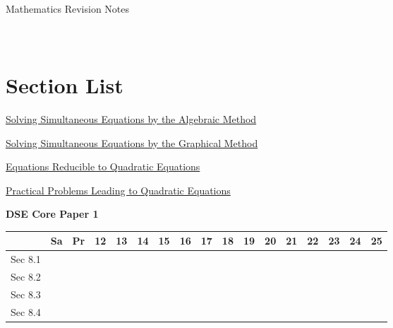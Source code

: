 \documentclass[12pt, a4paper]{article}
\begin{document}
\newpage
\newpage
\thispagestyle{empty}
\begin{center}
Mathematics Revision Notes\\\vspace{1cm}
\\\vspace{1cm}
{\fontsize{24pt}{24pt}\selectfont {More about Equations \NF}} \\\vspace{1cm}
\label{chapter:S4-8}

\end{center}
\vspace{0.5cm}
\hline
\section*{Section List}
\begin{enumx}[label=Sec 8.\arabic*\ ]
\item \hyperref[section:4-8-1]{Solving Simultaneous Equations by the Algebraic Method  \NF}
\item \hyperref[section:4-8-2]{Solving Simultaneous Equations by the Graphical Method \NF}
\item \hyperref[section:4-8-3]{Equations Reducible to Quadratic Equations \NF}
\item \hyperref[section:4-8-4]{Practical Problems Leading to Quadratic Equations \NF}
\end{enumx}
\begin{absolutelynopagebreak}
\begin{center}
\textbf{DSE Core Paper 1}
\end{center}
\begin{center}
\begin{tabular}{|l|c|c|c|c|c|c|c|c|c|c|c|c|c|c|c|c|}
\hline
        & Sa & Pr & 12 & 13 & 14 & 15 & 16 & 17 & 18 & 19 & 20 & 21 & 22 & 23 & 24 & 25 \\\hline\hline
Sec 8.1 &  &  &  &  &  &  &  &  &  &  &  &  &  &  &  &  \\\hline
Sec 8.2 &  &  &  &  &  &  &  &  &  &  &  &  &  &  &  &  \\\hline
Sec 8.3 &  &  &  &  &  &  &  &  &  &  &  &  &  &  &  &  \\\hline
Sec 8.4 &  &  &  &  &  &  &  &  &  &  &  &  &  &  &  &  \\\hline
\end{tabular}
\end{center}
\end{absolutelynopagebreak}
\end{document}
